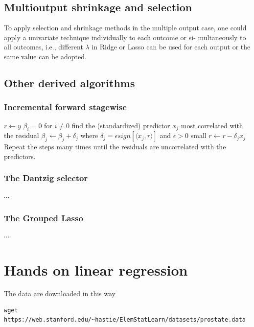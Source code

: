 \documentclass[12pt, letterpaper]{article}
\theoremstyle{definition}
\begin{document}
\subsection{Multioutput shrinkage and selection}
To apply selection and shrinkage methods in the multiple output case, one could apply a univariate technique individually to each outcome or si- multaneously to all outcomes, i.e., different $\lambda$ in Ridge or Lasso can be used for each output or the same value can be adopted.

\subsection{Other derived algorithms}
\subsubsection{Incremental forward stagewise}
\begin{algorithm}
$r\leftarrow y$ \;
$\beta_i =0$ for $i\ne 0$\;
find the (standardized) predictor $x_j$ most correlated with the residual \;
$\beta_j \leftarrow \beta_j + \delta_j$ where $\delta_j = \epsilon sign\left[\langle x_j, r \rangle\right]$ and $\epsilon >0$ small\;
$r\leftarrow r-\delta_j x_j$\;
Repeat the steps many times until the residuals are uncorrelated with the predictors.
\end{algorithm}

\subsubsection{The Dantzig selector}
$\cdots$

\subsubsection{The Grouped Lasso}
$\cdots$

\newpage

\section{Hands on linear regression}
The data are downloaded in this way 
\begin{lstlisting}
wget https://web.stanford.edu/~hastie/ElemStatLearn/datasets/prostate.data
\end{lstlisting}
\end{document}
